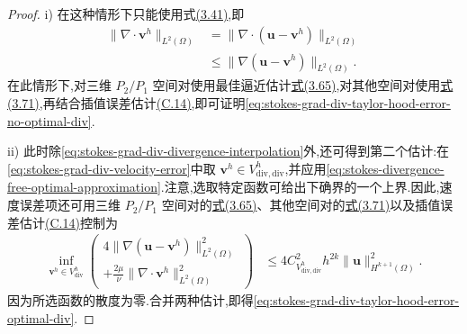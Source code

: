 \begin{proof}
i) 在这种情形下只能使用式\hyperref[eq:divergence-gradient-bound-h1]{(3.41)},即
\begin{equation}\label{eq:stokes-grad-div-divergence-interpolation}
\begin{aligned}
 \|\nabla\cdot\bm{v}^h\|_{L^2(\Omega)}
 &=\|\nabla\cdot(\bm{u}-\bm{v}^h)\|_{L^2(\Omega)}\\
 &\leq\|\nabla(\bm{u}-\bm{v}^h)\|_{L^2(\Omega)}.
\end{aligned}
\end{equation}
在此情形下,对三维 $P_2/P_1$ 空间对使用最佳逼近估计\hyperref[eq:best-approximation-vdiv-bound]{式(3.65)},对其他空间对使用\hyperref[eq:best-approximation-preserving-interpolant]{式(3.71)},再结合插值误差估计\hyperref[eq:interpolation-error-estimate]{(C.14)},即可证明\cref{eq:stokes-grad-div-taylor-hood-error-no-optimal-div}.

ii) 此时除\cref{eq:stokes-grad-div-divergence-interpolation}外,还可得到第二个估计:在\cref{eq:stokes-grad-div-velocity-error}中取 $\bm{v}^h\in V_{\mathrm{div,div}}^h$,并应用\cref{eq:stokes-divergence-free-optimal-approximation}.注意,选取特定函数可给出下确界的一个上界.因此,速度误差项还可用三维 $P_2/P_1$ 空间对的\hyperref[eq:best-approximation-vdiv-bound]{式(3.65)}、其他空间对的\hyperref[eq:best-approximation-preserving-interpolant]{式(3.71)}以及插值误差估计\hyperref[eq:interpolation-error-estimate]{(C.14)}控制为
\[
\begin{aligned}
 \inf_{\bm{v}^h\in V_{\mathrm{div}}^h}
   \left(\begin{gathered}
      4\|\nabla(\bm{u}-\bm{v}^h)\|_{L^2(\Omega)}^2\\
      +\frac{2\mu}{\nu}\|\nabla\cdot\bm{v}^h\|_{L^2(\Omega)}^2
   \end{gathered}\right)
 &\leq 4C_{V_{\mathrm{div,div}}^h}^2h^{2k}
          \|\bm{u}\|_{H^{k+1}(\Omega)}^2.
\end{aligned}
\]
因为所选函数的散度为零.合并两种估计,即得\cref{eq:stokes-grad-div-taylor-hood-error-optimal-div}.
\end{proof}

